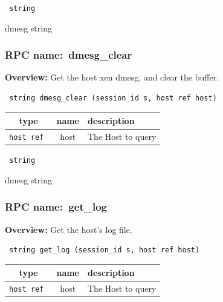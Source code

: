 \vspace{0.3cm}

{\tt 
string
}


dmesg string
\vspace{0.3cm}
\vspace{0.3cm}
\vspace{0.3cm}
\subsubsection{RPC name:~dmesg\_clear}

{\bf Overview:} 
Get the host xen dmesg, and clear the buffer.

\begin{verbatim} string dmesg_clear (session_id s, host ref host)\end{verbatim}



 
\vspace{0.3cm}
\begin{tabular}{|c|c|p{7cm}|}
 \hline
{\bf type} & {\bf name} & {\bf description} \\ \hline
{\tt host ref } & host & The Host to query \\ \hline 

\end{tabular}

\vspace{0.3cm}

{\tt 
string
}


dmesg string
\vspace{0.3cm}
\vspace{0.3cm}
\vspace{0.3cm}
\subsubsection{RPC name:~get\_log}

{\bf Overview:} 
Get the host's log file.

\begin{verbatim} string get_log (session_id s, host ref host)\end{verbatim}



 
\vspace{0.3cm}
\begin{tabular}{|c|c|p{7cm}|}
 \hline
{\bf type} & {\bf name} & {\bf description} \\ \hline
{\tt host ref } & host & The Host to query \\ \hline 

\end{tabular}

